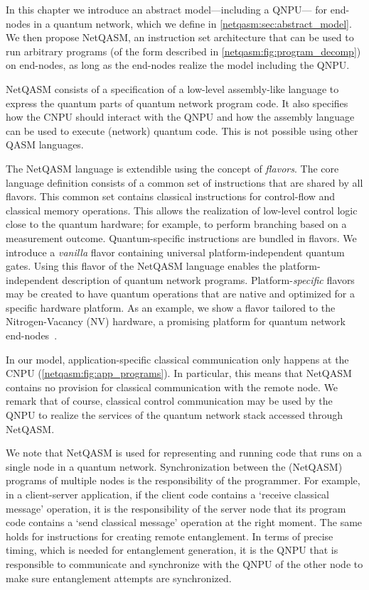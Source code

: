 In this chapter we introduce an abstract model---including a \ac{QNPU}--- for end-nodes in a quantum network, which we define in \cref{netqasm:sec:abstract_model}.
We then propose \ac{NetQASM}, an instruction set architecture that can be used to run arbitrary programs (of the form described in \cref{netqasm:fig:program_decomp}) on end-nodes, as long as the end-nodes realize the model including the QNPU.

\ac{NetQASM} consists of a specification of a low-level assembly-like language to express the quantum parts of quantum network program code.
It also specifies how the \ac{CNPU} should interact with the \ac{QNPU} and how the assembly language can be used to execute (network) quantum code.
This is not possible using other QASM languages.

The \ac{NetQASM} language is extendible using the concept of \textit{flavors}.
The core language definition consists of a common set of instructions that are shared by all flavors.
This common set contains classical instructions for control-flow and classical memory operations.
This allows the realization of low-level control logic close to the quantum hardware;
for example, to perform branching based on a measurement outcome.
Quantum-specific instructions are bundled in flavors.
We introduce a \textit{vanilla} flavor containing universal platform-independent quantum gates.
Using this flavor of the \ac{NetQASM} language enables the platform-independent description of quantum network programs.
Platform-\textit{specific} flavors may be created to have quantum operations that are native and optimized for a specific hardware platform.
As an example, we show a flavor tailored to the Nitrogen-Vacancy (NV) hardware, a promising platform for quantum network end-nodes~\cite{Taminiau2014, hanson2021realization}.

In our model, application-specific classical communication only happens at the \ac{CNPU} (\cref{netqasm:fig:app_programs}).
In particular, this means that \ac{NetQASM} contains no provision for classical communication with the remote node.
We remark that of course, classical control communication may be used by the \ac{QNPU} to realize the services of the quantum network stack accessed through \ac{NetQASM}.

We note that \ac{NetQASM} is used for representing and running code that runs on a single node in a quantum network.
Synchronization between the (\ac{NetQASM}) programs of multiple nodes is the responsibility of the programmer.
For example, in a client-server application, if the client code contains a `receive classical message' operation, it is the responsibility of the server node that its program code contains a `send classical message' operation at the right moment.
The same holds for instructions for creating remote entanglement.
In terms of precise timing, which is needed for entanglement generation, it is the \ac{QNPU} that is responsible to communicate and synchronize with the \ac{QNPU} of the other node to make sure entanglement attempts are synchronized.


